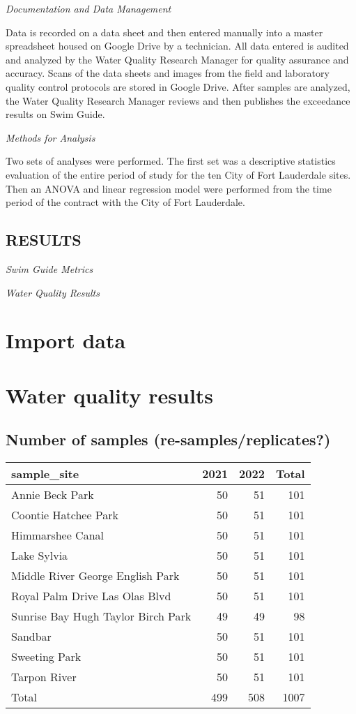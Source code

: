 \documentclass[
]{article}
\begin{document}
\emph{Documentation and Data Management}

Data is recorded on a data sheet and then entered manually into a master
spreadsheet housed on Google Drive by a technician. All data entered is
audited and analyzed by the Water Quality Research Manager for quality
assurance and accuracy. Scans of the data sheets and images from the
field and laboratory quality control protocols are stored in Google
Drive. After samples are analyzed, the Water Quality Research Manager
reviews and then publishes the exceedance results on Swim Guide.

\emph{Methods for Analysis}

Two sets of analyses were performed. The first set was a descriptive
statistics evaluation of the entire period of study for the ten City of
Fort Lauderdale sites. Then an ANOVA and linear regression model were
performed from the time period of the contract with the City of Fort
Lauderdale.

\hypertarget{results}{%
\subsection{RESULTS}\label{results}}

\emph{Swim Guide Metrics}

\emph{Water Quality Results}

\hypertarget{import-data}{%
\section{Import data}\label{import-data}}

\hypertarget{water-quality-results}{%
\section{Water quality results}\label{water-quality-results}}

\hypertarget{number-of-samples-re-samplesreplicates}{%
\subsection{Number of samples
(re-samples/replicates?)}\label{number-of-samples-re-samplesreplicates}}

\begin{longtable}[]{@{}lrrr@{}}
\toprule
sample\_site & 2021 & 2022 & Total\tabularnewline
\midrule
\endhead
Annie Beck Park & 50 & 51 & 101\tabularnewline
Coontie Hatchee Park & 50 & 51 & 101\tabularnewline
Himmarshee Canal & 50 & 51 & 101\tabularnewline
Lake Sylvia & 50 & 51 & 101\tabularnewline
Middle River George English Park & 50 & 51 & 101\tabularnewline
Royal Palm Drive Las Olas Blvd & 50 & 51 & 101\tabularnewline
Sunrise Bay Hugh Taylor Birch Park & 49 & 49 & 98\tabularnewline
Sandbar & 50 & 51 & 101\tabularnewline
Sweeting Park & 50 & 51 & 101\tabularnewline
Tarpon River & 50 & 51 & 101\tabularnewline
Total & 499 & 508 & 1007\tabularnewline
\bottomrule
\end{longtable}
\end{document}
